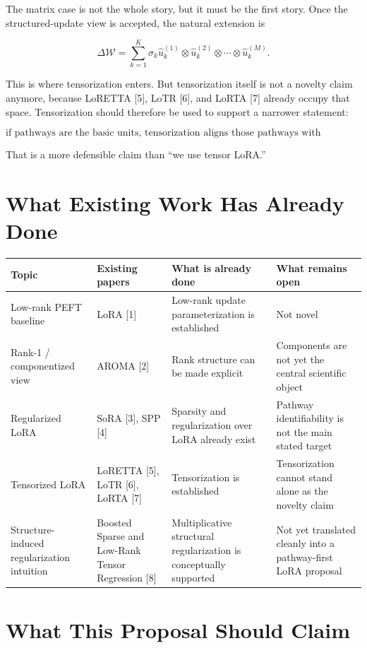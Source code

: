 \documentclass[11pt]{article}
\begin{document}
The matrix case is not the whole story, but it must be the first story. Once the structured-update view is accepted, the natural extension is

\[
\Delta \mathcal{W}
=
\sum_{k=1}^{K}
\sigma_k
\hat{u}^{(1)}_k \otimes \hat{u}^{(2)}_k \otimes \cdots \otimes \hat{u}^{(M)}_k.
\]

This is where tensorization enters. But tensorization itself is not a novelty claim anymore, because LoRETTA [5], LoTR [6], and LoRTA [7] already occupy that space. Tensorization should therefore be used to support a narrower statement:

\[
\text{if pathways are the basic units, tensorization aligns those pathways with architectural modes.}
\]

That is a more defensible claim than ``we use tensor LoRA.''

\section{What Existing Work Has Already Done}

\begin{longtable}{>{\raggedright\arraybackslash}p{} >{\raggedright\arraybackslash}p{} >{\raggedright\arraybackslash}p{} >{\raggedright\arraybackslash}p{}}
\toprule
Topic & Existing papers & What is already done & What remains open \\
\midrule
\endhead
Low-rank PEFT baseline & LoRA [1] & Low-rank update parameterization is established & Not novel \\
Rank-1 / componentized view & AROMA [2] & Rank structure can be made explicit & Components are not yet the central scientific object \\
Regularized LoRA & SoRA [3], SPP [4] & Sparsity and regularization over LoRA already exist & Pathway identifiability is not the main stated target \\
Tensorized LoRA & LoRETTA [5], LoTR [6], LoRTA [7] & Tensorization is established & Tensorization cannot stand alone as the novelty claim \\
Structure-induced regularization intuition & Boosted Sparse and Low-Rank Tensor Regression [8] & Multiplicative structural regularization is conceptually supported & Not yet translated cleanly into a pathway-first LoRA proposal \\
\bottomrule
\end{longtable}

\section{What This Proposal Should Claim}
\end{document}
